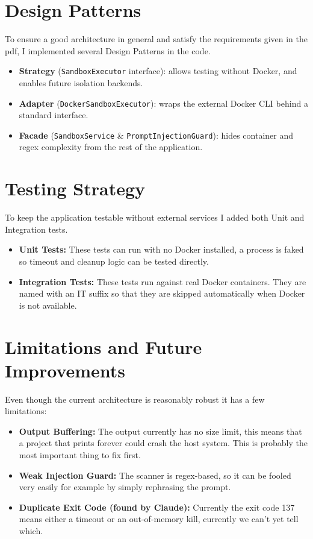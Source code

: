 \documentclass[11pt]{article}
\begin{document}
\section{Design Patterns}
To ensure a good architecture in general and satisfy the requirements given in the pdf, I implemented several Design Patterns in the code.

\begin{itemize}
    \item \textbf{Strategy} (\texttt{SandboxExecutor} interface): allows testing without Docker, and enables future isolation backends.
    \item \textbf{Adapter} (\texttt{DockerSandboxExecutor}): wraps the external Docker CLI behind a standard interface.
    \item \textbf{Facade} (\texttt{SandboxService} \& \texttt{PromptInjectionGuard}): hides container and regex complexity from the rest of the application.
\end{itemize}

\section{Testing Strategy}
To keep the application testable without external services I added both Unit and Integration tests.
\begin{itemize}
    \item \textbf{Unit Tests:} These tests can run with no Docker installed, a process is faked so timeout and cleanup logic can be tested directly.
    \item \textbf{Integration Tests:} These tests run against real Docker containers. They are named with an IT suffix so that they are skipped automatically when Docker is not available.
\end{itemize}

\section{Limitations and Future Improvements}
Even though the current architecture is reasonably robust it has a few limitations:
\begin{itemize}
    \item \textbf{Output Buffering:} The output currently has no size limit, this means that a project that prints forever could crash the host system. This is probably the most important thing to fix first.
    \item \textbf{Weak Injection Guard:} The scanner is regex-based, so it can be fooled very easily for example by simply rephrasing the prompt.
    \item \textbf{Duplicate Exit Code (found by Claude):} Currently the exit code 137 means either a timeout or an out-of-memory kill, currently we can't yet tell which.
\end{itemize}
\end{document}
